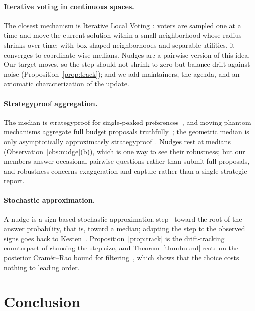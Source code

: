 \documentclass[doubleblind]{ecai}
\theoremstyle{remark}
\begin{document}
\paragraph{Iterative voting in continuous spaces.}
The closest mechanism is Iterative Local Voting~\cite{garg2019ilv}: voters are sampled one at a time and move the current solution within a small neighborhood whose radius shrinks over time; with box-shaped neighborhoods and separable utilities, it converges to coordinate-wise medians. Nudges are a pairwise version of this idea. Our target moves, so the step should not shrink to zero but balance drift against noise (Proposition~\ref{prop:track}); and we add maintainers, the agenda, and an axiomatic characterization of the update.

\paragraph{Strategyproof aggregation.}
The median is strategyproof for single-peaked preferences~\cite{moulin1980strategy}, and moving phantom mechanisms aggregate full budget proposals truthfully~\cite{freeman2021budget}; the geometric median is only asymptotically approximately strategyproof~\cite{elmhamdi2023median}. Nudges rest at medians (Observation~\ref{obs:nudge}(b)), which is one way to see their robustness; but our members answer occasional pairwise questions rather than submit full proposals, and robustness concerns exaggeration and capture rather than a single strategic report.

\paragraph{Stochastic approximation.}
A nudge is a sign-based stochastic approximation step~\cite{robbins1951sa} toward the root of the answer probability, that is, toward a median; adapting the step to the observed signs goes back to Kesten~\cite{kesten1958accelerated}. Proposition~\ref{prop:track} is the drift-tracking counterpart of choosing the step size, and Theorem~\ref{thm:bound} rests on the posterior Cram\'er--Rao bound for filtering~\cite{tichavsky1998pcrb}, which shows that the choice costs nothing to leading order.

\section{Conclusion}\label{sec:conclusion}
\end{document}
